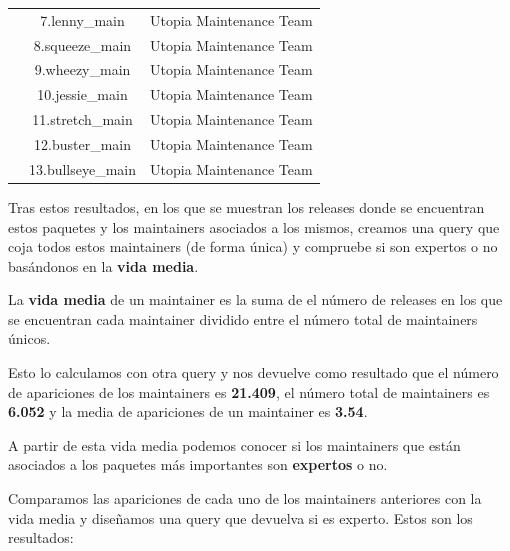 \documentclass[a4paper, 12pt]{book}
\begin{document}
\begin{longtable}{|c|c|c|}
		& 7.lenny\_main & Utopia Maintenance Team \\
		& 8.squeeze\_main & Utopia Maintenance Team \\
		& 9.wheezy\_main & Utopia Maintenance Team \\
		& 10.jessie\_main & Utopia Maintenance Team \\
		& 11.stretch\_main & Utopia Maintenance Team \\
		& 12.buster\_main & Utopia Maintenance Team \\
		& 13.bullseye\_main & Utopia Maintenance Team \\
		\hline
	\end{longtable}


Tras estos resultados, en los que se muestran los releases donde se encuentran estos paquetes y los maintainers asociados a los mismos, creamos una query que coja todos estos maintainers (de forma única) y compruebe si son expertos o no basándonos en la \textbf{vida media}.

La \textbf{vida media} de un maintainer es la suma de el número de releases en los que se encuentran cada maintainer dividido entre el número total de maintainers únicos. 

Esto lo calculamos con otra query y nos devuelve como resultado que el número de apariciones de los maintainers es \textbf{21.409}, el número total de maintainers es \textbf{6.052} y la media de apariciones de un maintainer es \textbf{3.54}.

A partir de esta vida media podemos conocer si los maintainers que están asociados a los paquetes más importantes son \textbf{expertos} o no.

Comparamos las apariciones de cada uno de los maintainers anteriores con la vida media y diseñamos una query que devuelva si es experto. Estos son los resultados:
\end{document}
